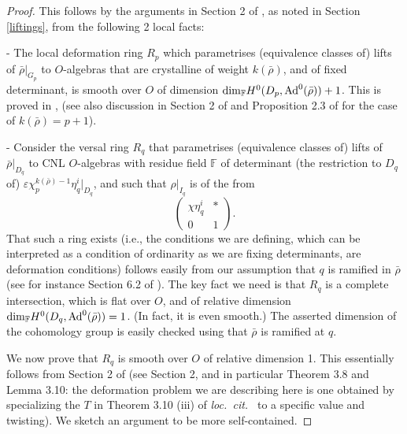 \documentclass[12pt]{amsart}
\newcommand{\rhobar}{\overline{\rho}}
\newcommand{\Ad}{{\rm Ad}}
\def\rhobar{ {\bar {\rho} } }
\def\rhob{ {\bar {\rho} } }
\newcommand{\F}{{\mathbb F}}
\newcommand{\vep}{{\varepsilon}}
\begin{document}
\begin{proof}
 This follows by the arguments in Section 2 of \cite{KW}, as noted in 
Section \ref{liftings}, 
from the following 2 local
facts: 

- The local deformation ring $R_p$ which parametrises (equivalence classes of)
lifts of $\rhobar|_{G_p}$
to $O$-algebras that are crystalline of weight $k(\rhobar)$, and of fixed determinant, is smooth over $ O$ of dimension ${\rm dim}{_\F} H^0(D_p,\Ad^0(\rhobar))+1$.
This is proved in \cite{[R00]}, \cite{Tay3} (see also discussion in Section 2
of \cite{KW} and Proposition 2.3 of 
\cite{KW} for the case of $k(\rhobar)=p+1$).

- Consider the versal ring $R_q$ that parametrises (equivalence classes of) lifts of
$\rhob|_{D_q}$ to CNL $O$-algebras with residue field $\F$ 
of determinant (the restriction to $D_q$ of) $\vep\chi_p^{k(\rhobar)-1}\eta_q^i|_{D_q}$, and such
that
$\rho|_{I_q}$ is of the from
$$\left( \begin{array}{cc}
     \chi\eta_q^i  & *  \\
    0 & 1
\end{array} \right).$$  That such a ring exists (i.e., the conditions we are defining, which can be interpreted as a condition of ordinarity as we are fixing determinants, are deformation conditions) follows easily from our assumption that $q$ is ramified in $\rhobar$ (see for instance Section 6.2 of \cite{dsl}). The key fact we need is that $R_q$ is a complete intersection, which is flat over $ O$, and of relative
dimension ${\rm dim}_{\F}H^0(D_q,\Ad^0(\rhobar))=1$. (In fact, it is even smooth.) The asserted dimension of the cohomology group is easily checked using
that $\rhobar$ is ramified at $q$.

We now prove that $R_q$ is smooth over $O$ of relative dimension 1.
This essentially follows from Section 2 of \cite{Boe} 
(see Section 2, and in particular Theorem 3.8 and Lemma 3.10: the deformation problem we are describing here 
is one obtained by specializing the $T$ in 
Theorem 3.10 (iii) of {\it loc.\ cit.\ } to a specific value and twisting).
We sketch an argument to be more self-contained. 


\end{proof}
\end{document}
